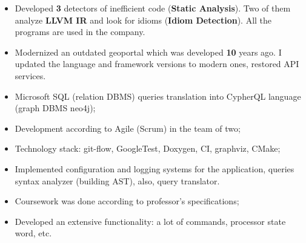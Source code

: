 \documentclass[10pt,a4paper,ragged2e,withhyper]{custom-altacv}
\begin{document}
\begin{paracol}{2}



\begin{itemize}
	\item Developed \textbf{3} detectors of inefficient code (\textbf{Static Analysis}). Two of them analyze \textbf{LLVM IR} and look for idioms (\textbf{Idiom Detection}). All the programs are used in the company.
\end{itemize}

\divider


\begin{itemize}
	\item Modernized an outdated geoportal which was developed \textbf{10} years ago. I updated the language and framework versions to modern ones, restored API services.
\end{itemize}





\begin{itemize}
	\item Microsoft SQL (relation DBMS) queries translation into CypherQL language (graph DBMS neo4j);
	\item Development according to Agile (Scrum) in the team of two;
	\item Technology stack: git-flow, GoogleTest, Doxygen, CI, graphviz, CMake;
	\item Implemented configuration and logging systems for the application, queries syntax analyzer (building AST), also, query translator.
\end{itemize}

\divider


\begin{itemize}
	\item Coursework was done according to professor's specifications;
	\item Developed an extensive functionality: a lot of commands, processor state word, etc.
\end{itemize}




\end{paracol}
\end{document}
